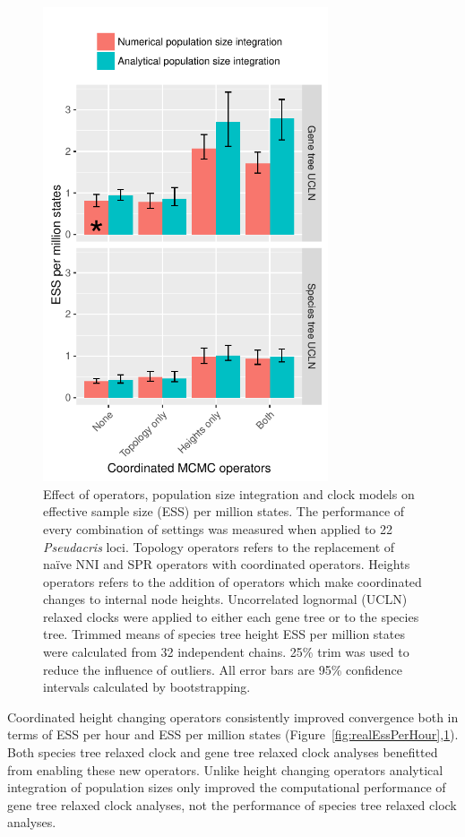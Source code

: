 \documentclass[12pt]{article}
\begin{document}
\begin{figure}[htb!]
\centering
\includegraphics[height=14cm]{speciesTreeHeight_ess_per_mstates.pdf}
\caption
{Effect of operators, population size integration and clock models on effective
sample size (ESS) per million states. The performance of every combination of
settings was measured when applied to 22 \textit{Pseudacris} loci. Topology operators refers to the
replacement of na\"ive NNI and SPR operators with coordinated operators. Heights
operators refers to the addition of operators which make coordinated changes to
internal node heights. Uncorrelated lognormal (UCLN) relaxed clocks were applied
to either each gene tree or to the species tree. Trimmed means
of species tree height ESS per million states were calculated from 32
independent chains. 25\% trim was used to reduce the influence
of outliers. All error bars are 95\% confidence intervals calculated by
bootstrapping.}
\label{fig:realEssPerMstates}
\end{figure}

Coordinated height changing operators consistently improved convergence both in
terms of ESS per hour and ESS per million states
(Figure~\ref{fig:realEssPerHour},\ref{fig:realEssPerMstates}). Both species tree
relaxed clock and gene tree relaxed clock analyses benefitted from enabling
these new operators. Unlike height changing operators analytical integration of
population sizes only improved the computational performance of gene tree
relaxed clock analyses, not the performance of species tree relaxed clock
analyses.
\end{document}
